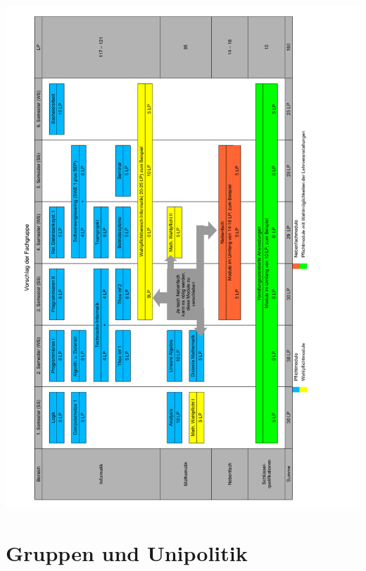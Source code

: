\documentclass[]{papertex}
\begin{document}
		\begin{minipage}{1.0\linewidth}
		\begin{center} 
  			\includegraphics[totalheight=\textheight, width=\textwidth ]{bilder/studienplan_bsc_ss/FG_Vorschlag_BeginSS}
  			\label{studienplan_neu}
		\end{center}
		\end{minipage}
	
	
	\newpage
	\section{Gruppen und Unipolitik}
		\label{politik}
		\begin{multicols}{2}
		
		
		\end{multicols}
	\newpage
\end{document}
